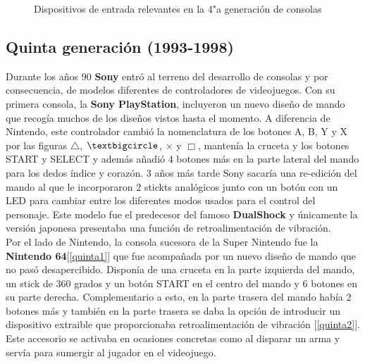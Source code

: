 \begin{figure}[!ht]
     \hfill
     \caption{Dispositivos de entrada relevantes en la 4"a  generaci\'on de consolas}
     \label{fig:cuarta}
   \end{figure}

\subsection{Quinta generaci\'on (1993-1998)}

Durante los a\~nos 90 \textbf{Sony} entr\'o al terreno del desarrollo de consolas y por consecuencia, de modelos diferentes de controladores de videojuegos. Con su primera consola, la \textbf{Sony PlayStation}, incluyeron un nuevo dise\~no de mando que recog\'ia muchos de los dise\~nos vistos hasta el momento. A diferencia de Nintendo, este controlador cambi\'o la nomenclatura de los botones A, B, Y y X por las figuras $\triangle$, $\textbigcircle$, $\times$ y $\Box$, manten\'ia la cruceta y los botones START y SELECT y adem\'as a\~nadi\'o 4 botones m\'as en la parte lateral del mando para los dedos \'indice y coraz\'on. 3 a\~nos m\'as tarde Sony sacar\'ia una re-edici\'on del mando al que le incorporaron 2 stickts anal\'ogicos junto con un bot\'on con un LED para cambiar entre los diferentes modos usados para el control del personaje. Este modelo fue el predecesor del famoso \textbf{DualShock} y \'unicamente la versi\'on japonesa presentaba una funci\'on de retroalimentaci\'on de vibraci\'on. \\

Por el lado de Nintendo, la consola sucesora de la Super Nintendo fue la \textbf{Nintendo 64}[\ref{quinta1}] que fue acompa\~nada por un nuevo dise\~no de mando que no pas\'o desapercibido. Dispon\'ia de una cruceta en la parte izquierda del mando, un stick de 360 grados y un bot\'on START en el centro del mando y 6 botones en su parte derecha. Complementario a esto, en la parte trasera del mando hab\'ia 2 botones m\'as y tambi\'en en la parte trasera se daba la opci\'on de introducir un dispositivo extraible que proporcionaba retroalimentaci\'on de vibraci\'on [\ref{quinta2}]. Este accesorio se activaba en ocasiones concretas como al disparar un arma y serv\'ia para sumergir al jugador en el videojuego.\\

